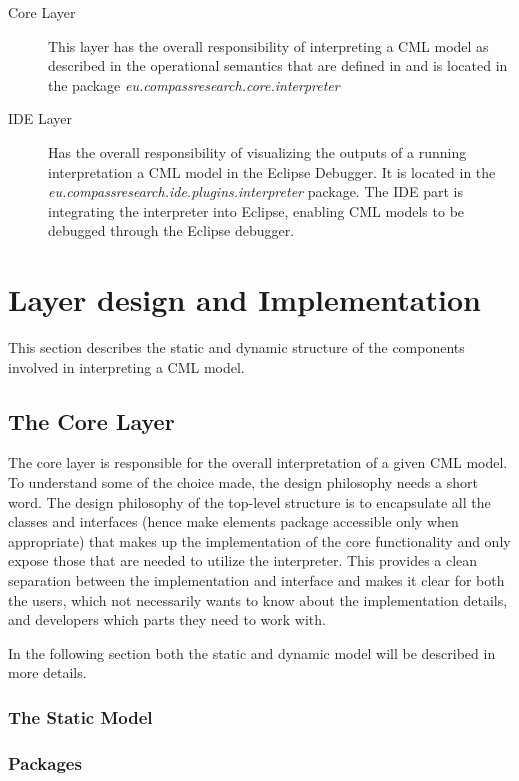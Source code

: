 \documentclass[a4paper, 10pt]{include/compassreport}   %
\begin{document}
\begin{description}
\item[Core Layer] This layer has the overall responsibility of interpreting a CML model
as described in the operational semantics that are defined in
\cite{D23.4} and is located in the package
\emph{eu.compassresearch.core.interpreter}

\item[IDE Layer] Has the overall responsibility of visualizing the outputs of a running
interpretation a CML model in the Eclipse Debugger. It is located in
the \emph{eu.compassresearch.ide.plugins.interpreter} package.  The
IDE part is integrating the interpreter into Eclipse, enabling CML
models to be debugged through the Eclipse
debugger. 

\end{description}

\section{Layer design and Implementation}
This section describes the static and dynamic structure of the
components involved in interpreting a CML model.

\subsection{The Core Layer}
The core layer is responsible for the overall interpretation of a
given CML model. To understand some of the choice made, the design
philosophy needs a short word. The design philosophy of the top-level
structure is to encapsulate all the classes and interfaces (hence make
elements package accessible only when appropriate) that makes up the
implementation of the core functionality and only expose those that
are needed to utilize the interpreter. This provides a clean
separation between the implementation and interface and makes it clear
for both the users, which not necessarily wants to know about the
implementation details, and developers which parts they need to work
with. 

In the following section both the static and dynamic
model will be described in more details.

\subsubsection{The Static Model}
\label{sec:static_structure}

\subsubsection*{Packages}
\end{document}
